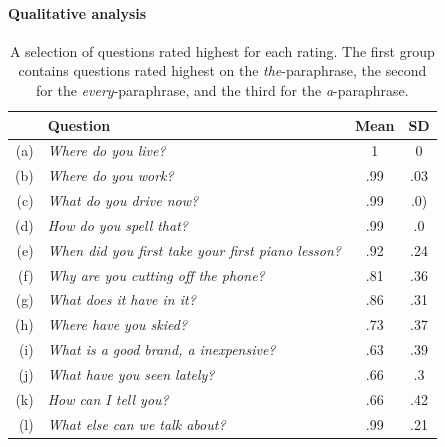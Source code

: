 \documentclass[12pt,letterpaper,table,svgnames,dvipsnames]{article}
\newcommand{\jd}[1]{\textcolor{Purple}{[jd: #1]}}
\begin{document}



\paragraph{Qualitative analysis}

\begin{table}[h!]
    \centering
    \begin{tabular}{rlcc}
        \toprule
        {} & \textbf{Question} & \textbf{Mean} & \textbf{SD} \\
        \midrule
        (a) & \emph{Where do you live?}       & 1   & 0\\
        (b) & \emph{Where do you work?}       &.99  & .03 \\
        (c) & \emph{What do you drive now?}   &.99    & .0) \\
        (d) & \emph{How do you spell that?}   &.99 &.0\\
        (e) & \emph{When did you first take your first piano lesson?} &.92 & .24 \\
        (f) & \emph{Why are you cutting off the phone?} & .81 & .36\\
        \midrule
        (g) & \emph{What does it have in it?} & .86 & .31 \\
        (h) & \emph{Where have you skied?} &.73 & .37 \\
        \midrule
        (i) & \emph{What is a good brand, a inexpensive?} & .63 & .39\\
        (j) & \emph{What have you seen lately?} & .66 & .3\\
        (k) & \emph{How can I tell you?} & .66 & .42 \\
        (l) & \emph{What else can we talk about?} & .99 & .21\\
        \bottomrule
    \end{tabular}
    \caption{A selection of questions rated highest for each rating. The first group contains questions rated highest on the \emph{the}-paraphrase, the second for the \emph{every}-paraphrase, and the third for the \emph{a}-paraphrase.}
    \label{tab:e1-qualitative}
\end{table}
\end{document}
